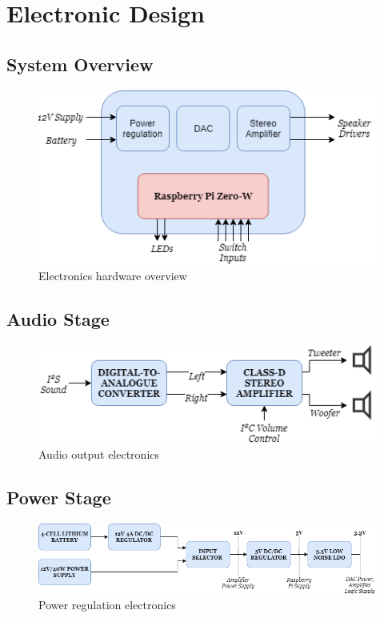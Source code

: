 \documentclass[main.tex]{subfiles}
\begin{document}
\chapter{Electronic Design}
\section{System Overview}



\begin{figure}[H]
    \centering
    \includegraphics[scale=0.75]{./figs/electronics-system.png}        
    \caption{Electronics hardware overview}
    \label{fig:electronics-system}
\end{figure}

\section{Audio Stage}

\begin{figure}[H]
    \centering
    \includegraphics[scale=0.75]{./figs/audio-system.png}
    \caption{Audio output electronics}
    \label{fig:audio-system}
\end{figure}

\section{Power Stage}

\begin{figure}[H]
    \centering
    \includegraphics[scale=0.6]{./figs/power-system.png}
    \caption{Power regulation electronics}
    \label{fig:power-system}
\end{figure}
\end{document}

